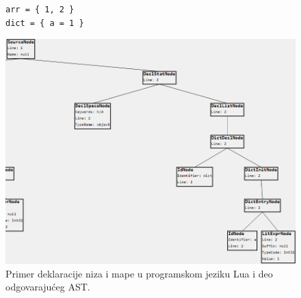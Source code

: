 \begin{figure}[h!]
\begin{lstlisting}
arr = { 1, 2 }
dict = { a = 1 }
\end{lstlisting}
\centering
\includegraphics[scale=0.63]{images/lua_ast_decl_cropped.png}
\caption{Primer deklaracije niza i mape u programskom jeziku Lua i deo odgovarajućeg AST.}
\label{fig:MyASTExampleLuaDeclaration}
\end{figure}

